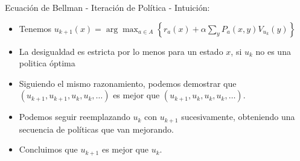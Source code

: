 \documentclass[handout]{beamer}
\begin{document}
\begin{frame}{Ecuación de Bellman - Iteración de Política - Intuición:}
\begin{itemize}
\item Tenemos
$u_{k+1}(x) = \arg\max_{a \in A} \left\{r_a(x) + \alpha\sum_y P_a(x,y)V_{u_k}(y)\right\}$
\item<4->
La desigualdad es estricta por lo menos para un estado $x$, si $u_k$ no es una politica óptima
\item<6-> Siguiendo el mismo razonamiento, podemos demostrar que $(u_{k+1},u_{k+1},u_k,u_k,\dots)$ es mejor que $(u_{k+1},u_k,u_k,u_k,\dots)$.
\item<7-> Podemos seguir reemplazando $u_k$ con $u_{k+1}$ sucesivamente, obteniendo una secuencia de políticas que van mejorando.
\item<8-> Concluimos que $u_{k+1}$ es mejor que $u_k$.
\end{itemize}
\end{frame}
\end{document}
